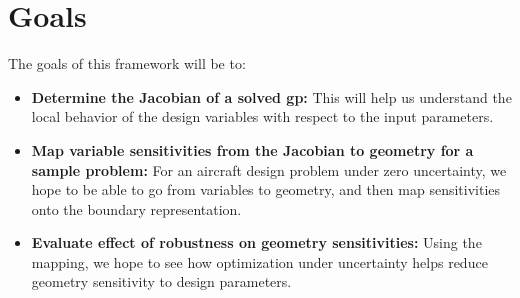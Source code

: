 \documentclass[journal]{new-aiaa}
\begin{document}
\section{Goals}

The goals of this framework will be to:
\begin{itemize}
    \item \textbf{Determine the Jacobian of a solved \gls{gp}:}
                This will help us understand the local behavior
                of the design variables with respect to the input parameters.
    \item \textbf{Map variable sensitivities from the Jacobian to geometry for a sample problem:}
                For an aircraft design problem under zero uncertainty, we hope to be able to
                go from variables to geometry, and then map sensitivities onto the boundary representation.
    \item \textbf{Evaluate effect of robustness on geometry sensitivities:}
                Using the mapping, we hope to see how optimization under uncertainty
                helps reduce geometry sensitivity to design parameters. 
\end{itemize}



\end{document}

